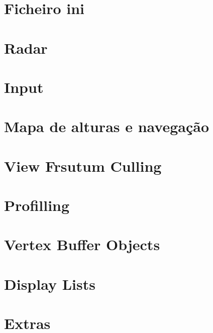 \documentclass[12pt,a4paper,portuges]{style/myreport}
\begin{document}
\newpage


\chapter{Ficheiro ini}


\newpage

\chapter{Radar}


\newpage

\chapter{Input}


\newpage	

\chapter{Mapa de alturas e navegação}



\chapter{View Frsutum Culling}


\newpage

\chapter{Profilling}


\newpage

\chapter{Vertex Buffer Objects}


\chapter{Display Lists}


\chapter{Extras}
\end{document}
